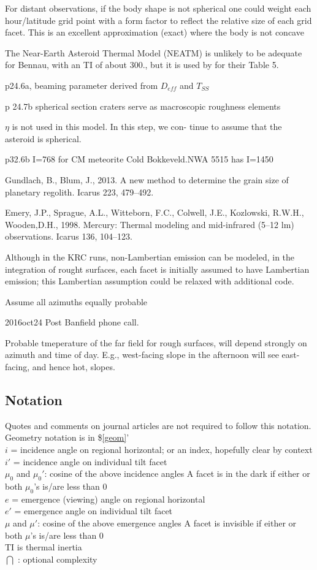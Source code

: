 \documentclass{article}
\begin{document}
For distant observations, if the body shape is not spherical one could weight
each hour/latitude grid point with a form factor to reflect the relative size of
each grid facet. This is an excellent approximation (exact) where the body is
not concave

The Near-Earth Asteroid Thermal Model (NEATM)  is unlikely to be
adequate for Bennau, with an TI of about 300., but it is used by 
for their Table 5.

p24.6a, beaming parameter derived from $D_{eff}$ and $T_{SS}$

p 24.7b spherical section craters serve as macroscopic roughness elements 

$\eta$ is not used in this model. In this step, we con-
tinue to assume that the asteroid is spherical.

p32.6b I=768 for  CM meteorite Cold Bokkeveld.NWA 5515 has I=1450 

Gundlach, B., Blum, J., 2013. A new method to determine the grain size of planetary regolith. Icarus 223, 479–492.


Emery, J.P., Sprague, A.L., Witteborn, F.C., Colwell, J.E., Kozlowski, R.W.H.,
Wooden,D.H., 1998. Mercury: Thermal modeling and mid-infrared (5–12 lm)
observations. Icarus 136, 104–123.


Although in the KRC runs, non-Lambertian emission can be modeled, in the
integration of rought surfaces, each facet is initially assumed to have
Lambertian emission; this Lambertian assumption could be relaxed with additional
code.
 
Assume all azimuths equally probable 

2016oct24 Post Banfield phone call.

Probable tmeperature of the far field for rough surfaces, will depend strongly on azimuth and time of day. E.g., west-facing slope in the afternoon will see east-facing, and hence hot, slopes.
 
\subsection{Notation \label{nota} }
Quotes and comments on journal articles are not required to follow this notation.
Geometry notation is in \$\ref{geom}'
\\ $i$ = incidence angle on regional horizontal; or an index, hopefully clear by context
\\ $i'$ = incidence angle on individual tilt facet
\\ $\mu_0$ and $\mu_0'$: cosine of the above incidence angles
\qi  A facet is in the dark if either or both $\mu_0$'s is/are less than 0
\\ $e$ = emergence (viewing) angle on regional horizontal
\\ $e'$ = emergence angle on individual tilt facet
\\ $\mu$ and $\mu'$: cosine of the above emergence angles
\qi  A facet is invisible if either or both $\mu$'s is/are less than 0
\\ TI is thermal inertia
\\ $\bigcap$ : optional complexity
\end{document}
